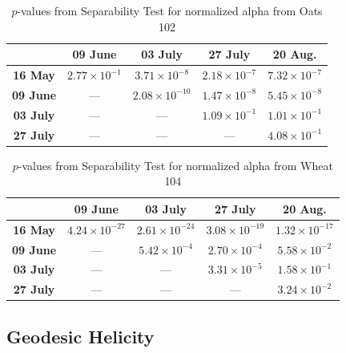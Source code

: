 \documentclass[journal]{IEEEtran}
\begin{document}
\begin{table}[hbt]
  \footnotesize
  \centering
  \caption{$p$-values from Separability Test for normalized alpha from Oats 102}
  \label{tab:pvalues_sep_alpha_ot102}
  \begin{tabular}{ccccc}
  \toprule
  & \textbf{09 June} & \textbf{03 July} & \textbf{27 July} & \textbf{20 Aug.}\\ \midrule
  \textbf{16 May}  & $2.77 \times 10^{-1}$ & $3.71 \times 10^{-8}$ & $2.18 \times 10^{-7}$ & $7.32 \times 10^{-7}$ \\
  \textbf{09 June}  & --- & $2.08 \times 10^{-10}$ & $1.47 \times 10^{-8}$ & $5.45 \times 10^{-8}$ \\
  \textbf{03 July}  & --- & --- & $1.09 \times 10^{-1}$ & $1.01 \times 10^{-1}$\\
  \textbf{27 July}  & --- & --- & --- & $4.08 \times 10^{-1}$ \\
  \bottomrule
  \end{tabular}
\end{table}

\begin{table}[hbt]
  \footnotesize
  \centering
  \caption{$p$-values from Separability Test for normalized alpha from Wheat 104}
  \label{tab:pvalues_sep_alpha_wt104}
  \begin{tabular}{ccccc}
  \toprule
  & \textbf{09 June} & \textbf{03 July} & \textbf{27 July} & \textbf{20 Aug.}\\ \midrule
  \textbf{16 May}  & $4.24 \times 10^{-27}$ & $2.61 \times 10^{-24}$ & $3.08 \times 10^{-19}$ & $1.32 \times 10^{-17}$ \\
  \textbf{09 June}  & --- & $5.42 \times 10^{-4}$ & $2.70 \times 10^{-4}$ & $5.58 \times 10^{-2}$ \\
  \textbf{03 July}  & --- & --- & $3.31 \times 10^{-5}$ & $1.58 \times 10^{-1}$\\
  \textbf{27 July}  & --- & --- & --- & $3.24 \times 10^{-2}$ \\
  \bottomrule
  \end{tabular}
\end{table}

\subsection{Geodesic Helicity}

\end{document}
